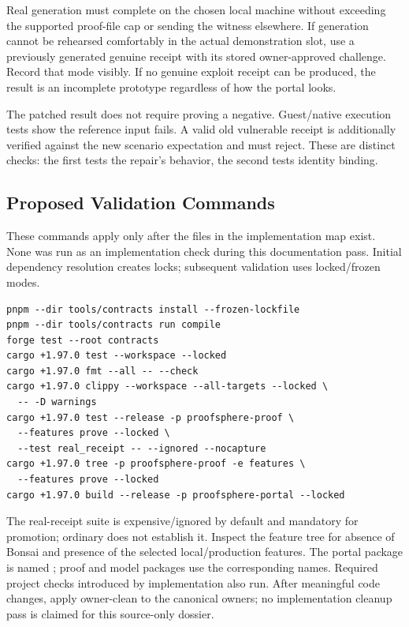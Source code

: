 \documentclass[11pt]{article}
\begin{document}
Real generation must complete on the chosen local machine without exceeding the supported proof-file cap or sending the witness elsewhere. If generation cannot be rehearsed comfortably in the actual demonstration slot, use a previously generated genuine receipt with its stored owner-approved challenge. Record that mode visibly. If no genuine exploit receipt can be produced, the result is an incomplete prototype regardless of how the portal looks.

The patched result does not require proving a negative. Guest/native execution tests show the reference input fails. A valid old vulnerable receipt is additionally verified against the new scenario expectation and must reject. These are distinct checks: the first tests the repair's behavior, the second tests identity binding.

\subsection{Proposed Validation Commands}
These commands apply only after the files in the implementation map exist. None was run as an implementation check during this documentation pass. Initial dependency resolution creates locks; subsequent validation uses locked/frozen modes.
\begin{verbatim}
pnpm --dir tools/contracts install --frozen-lockfile
pnpm --dir tools/contracts run compile
forge test --root contracts
cargo +1.97.0 test --workspace --locked
cargo +1.97.0 fmt --all -- --check
cargo +1.97.0 clippy --workspace --all-targets --locked \
  -- -D warnings
cargo +1.97.0 test --release -p proofsphere-proof \
  --features prove --locked \
  --test real_receipt -- --ignored --nocapture
cargo +1.97.0 tree -p proofsphere-proof -e features \
  --features prove --locked
cargo +1.97.0 build --release -p proofsphere-portal --locked
\end{verbatim}

The real-receipt suite is expensive/ignored by default and mandatory for promotion; ordinary  does not establish it. Inspect the feature tree for absence of Bonsai and presence of the selected local/production features. The portal package is named ; proof and model packages use the corresponding  names. Required project checks introduced by implementation also run. After meaningful code changes, apply owner-clean to the canonical owners; no implementation cleanup pass is claimed for this source-only dossier.
\end{document}
